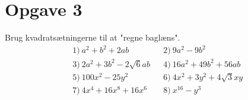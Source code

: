 \section*{Opgave 3}
Brug kvadratsætningerne til at "regne baglæns".
\begin{align*}
&1) \  a^2+b^2+2ab  &&2) \  9a^2-9b^2   \\
&3) \  2a^2+3b^2-2\sqrt{6}ab  &&4) \  16a^2+49b^2+56ab   \\
&5) \   100x^2 - 25y^2  &&6) \   4x^2+3y^2+4\sqrt{3}xy   \\
&7) \  4x^4+16x^8+16x^6  &&8) \ x^{16}-y^{3}     
\end{align*}